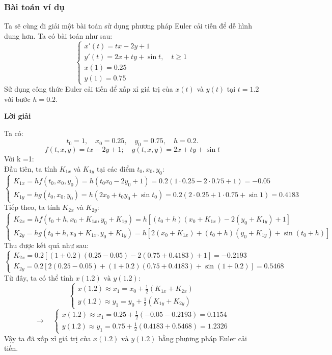 \documentclass[a4paper,15pt]{article}
\begin{document}
\subsubsection{Bài toán ví dụ}
Ta sẽ cùng đi giải một bài toán sử dụng phương pháp Euler cải tiến để dễ hình dung hơn. Ta có bài toán như sau:
\[
\begin{cases}
x'(t) = tx - 2y + 1 \\
y'(t) = 2x + ty + \sin t, \quad t \geq 1 \\
x(1) = 0.25 \\
y(1) = 0.75
\end{cases}
\]
Sử dụng công thức Euler cải tiến để xấp xỉ giá trị của $x(t)$ và $y(t)$ tại $t = 1.2$ với bước $h = 0.2$.
\begin{center}
    \textbf{Lời giải}
\end{center}
Ta có: 
\[
t_0 = 1, \quad x_0 = 0.25, \quad y_0 = 0.75,  \quad h = 0.2.
\]
\[
f(t,x,y) = tx - 2y +1;\quad g(t,x,y) = 2x +ty+ \sin t
\]
Với k =1: \\
Đầu tiên, ta tính $K_{1x}$ và $K_{1y}$ tại các điểm $t_0,x_0,y_0$:
\[
\begin{cases}
    K_{1x} = hf(t_0,x_0,y_0) = h(t_0x_0 -2y_0 +1) = 0.2(1 \cdot 0.25 -2\cdot0.75 +1) = -0.05 \\
    K_{1y} = hg(t_0, x_0, y_0) = h(2x_0 + t_0 y_0 + \sin t_0) = 0.2(2 \cdot 0.25 + 1 \cdot 0.75 +\sin 1) =  0.4183
\end{cases}
\]
Tiếp theo, ta tính $K_{2x}$ và $K_{2y}$:
\[
\begin{cases}
K_{2x} = hf(t_0 + h, x_0 + K_{1x}, y_0 + K_{1y}) 
       = h[(t_0 + h)(x_0 + K_{1x}) - 2(y_0 + K_{1y}) + 1] \\
K_{2y} = hg(t_0 + h, x_0 + K_{1x}, y_0 + K_{1y})
       = h[2(x_0 + K_{1x}) + (t_0 + h)(y_0 + K_{1y}) + \sin(t_0 + h)]
\end{cases}
\]
Thu được kết quả như sau:
\[
\begin{cases}
    K_{2x} = 0.2[(1 + 0.2)(0.25 -0.05) -2(0.75 + 0.4183) +1] = -0.2193 \\
    K_{2y} = 0.2[2(0.25 -0.05) + (1 + 0.2)(0.75 + 0.4183) + \sin(1 +0.2)] = 0.5468
\end{cases}
\]
Từ đây, ta có thể tính $x(1.2)  \text{ và } y(1.2) $:
\[
\begin{cases}
    x(1.2) \approx x_1 = x_0 + \frac{1}{2}(K_{1x} + K_{2x}) \\
    y(1.2) \approx y_1 = y_0 + \frac{1}{2}(K_{1y} + K_{2y})
\end{cases}
\]
\[
\rightarrow
\quad 
\begin{cases}
    x(1.2) \approx x_1 = 0.25 + \frac{1}{2}(-0.05 - 0.2193) = 0.1154 \\
    y(1.2) \approx y_1 = 0.75 + \frac{1}{2} (0.4183 + 0.5468) = 1.2326
\end{cases}
\]
Vậy ta đã xấp xỉ giá trị của $x(1.2) \text{ và } y(1.2)$ bằng phương pháp Euler cải tiến.
\end{document}
